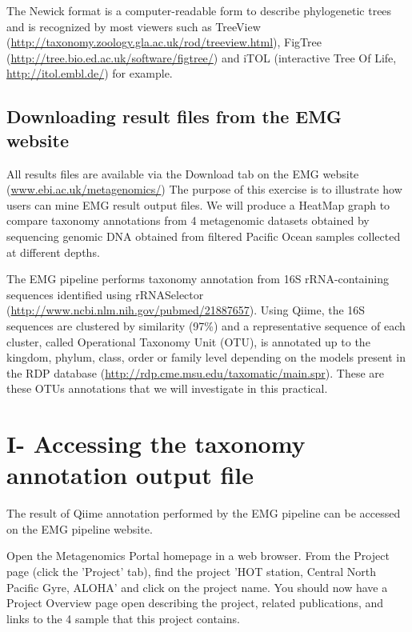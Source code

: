 \documentclass[a4paper,12pt,twoside]{memoir}
\begin{document}
\clearpage

\begin{information}
The Newick format is a computer-readable form to describe phylogenetic trees and is recognized by most viewers such as TreeView (\url{http://taxonomy.zoology.gla.ac.uk/rod/treeview.html}), FigTree (\url{http://tree.bio.ed.ac.uk/software/figtree/}) and iTOL (interactive Tree Of Life, \url{http://itol.embl.de/}) for example.
\end{information}

\subsection{Downloading result files from the EMG website}

\begin{information}
All results files are available via the Download tab on the EMG website (\url{www.ebi.ac.uk/metagenomics/}) 
The purpose of this exercise is to illustrate how users can mine EMG result output files.
We will produce a HeatMap graph to compare taxonomy annotations from 4 metagenomic datasets obtained by sequencing genomic DNA obtained from filtered Pacific Ocean samples collected at different depths.

The EMG pipeline performs taxonomy annotation from 16S rRNA-containing sequences identified using rRNASelector (\url{http://www.ncbi.nlm.nih.gov/pubmed/21887657}). Using Qiime, the 16S sequences are clustered by similarity (97\%) and a representative sequence of each cluster, called Operational Taxonomy Unit (OTU), is annotated up to the kingdom, phylum, class, order or family level depending on the models present in the RDP database (\url{http://rdp.cme.msu.edu/taxomatic/main.spr}). These are these OTUs annotations that we will investigate in this practical.
\end{information}

\section{I- Accessing the taxonomy annotation output file}

\begin{information}
The result of Qiime annotation performed by the EMG pipeline can be accessed on the EMG pipeline website.
\end{information}

\begin{steps}
Open the Metagenomics Portal homepage in a web browser.
From the Project page (click the 'Project' tab), find the project 'HOT station, Central North Pacific Gyre, ALOHA' and click on the project name.
You should now have a Project Overview page open describing the project, related publications, and links to the 4 sample that this project contains.
\end{steps}
\end{document}
